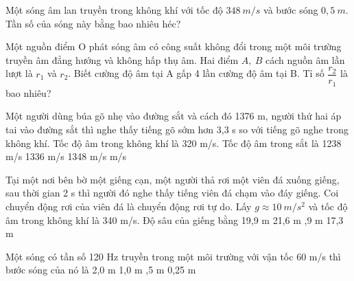 \begin{ex}%
Một sóng âm lan truyền trong không khí với tốc độ $348 ~m/s$ và bước sóng $0,5 ~m$. Tần số của sóng này bằng bao nhiêu héc?\\ 
\end{ex} 

\begin{ex}%
Một nguồn điểm O phát sóng âm có công suất không đổi trong một môi trường truyền âm đẳng hướng và không hấp thụ âm. Hai điểm $A,\ B$ cách nguồn âm lần lượt là $r_1$ và $r_2$. Biết cường độ âm tại A gấp 4 lần cường độ âm tại B. Tỉ số $\dfrac{r_2}{r_1}$ là bao nhiêu?
\end{ex} 
\begin{ex}%
Một người dùng búa gõ nhẹ vào đường sắt và cách đó 1376 m, người thứ hai áp tai vào đường sắt thì nghe thấy tiếng gõ sớm hơn 3,3 s so với tiếng gõ nghe trong không khí. Tốc độ âm trong không khí là 320 m/s. Tốc độ âm trong sắt là 
\choice
{1238 m/s}
{1336 m/s}
{1348 m/s}
{ m/s}
\end{ex} 
\begin{ex}%
Tại một nơi bên bờ một giếng cạn, một người thả rơi một viên đá xuống giếng, sau thời gian 2 s thì người đó nghe thấy tiếng viên đá chạm vào đáy giếng. Coi chuyển động rơi của viên đá là chuyển động rơi tự do. Lấy $g\approx 10\ m/s^2$ và tốc độ âm trong không khí là 340 m/s. Độ sâu của giếng bằng
\choice
{19,9 m}
{21,6 m}
{,9 m}
{17,3 m}
\end{ex} 
\begin{ex}%
Một sóng có tần số 120 Hz truyền trong một môi trường với vận tốc 60 m/s thì bước sóng của nó là
\choice
{2,0 m}
{1,0 m}
{,5 m}
{0,25 m}
\end{ex} 
